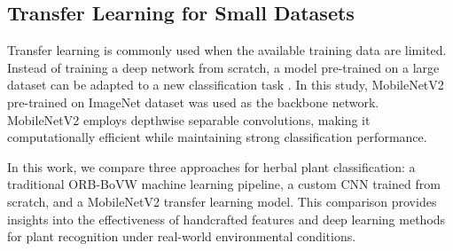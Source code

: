 \subsection{Transfer Learning for Small Datasets}

Transfer learning is commonly used when the available training data are limited. Instead of training a deep network from scratch, a model pre-trained on a large dataset can be adapted to a new classification task \cite{transferlearning}. In this study, MobileNetV2 \cite{mobilenetv2} pre-trained on ImageNet dataset \cite{imagenet} was used as the backbone network. MobileNetV2 employs depthwise separable convolutions, making it computationally efficient while maintaining strong classification performance.

In this work, we compare three approaches for herbal plant classification: a traditional ORB-BoVW machine learning pipeline, a custom CNN trained from scratch, and a MobileNetV2 transfer learning model. This comparison provides insights into the effectiveness of handcrafted features and deep learning methods for plant recognition under real-world environmental conditions.
